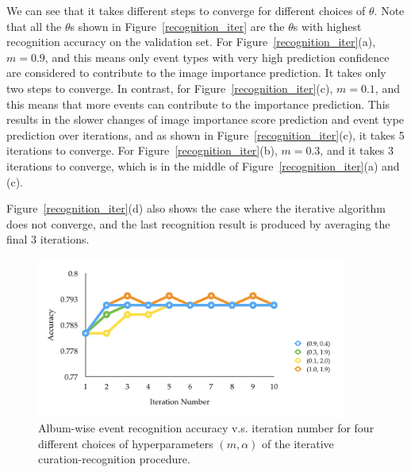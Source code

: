 \documentclass[runningheads]{llncs}
\begin{document}
We can see that it takes different steps to converge for different choices of $\theta$. Note that all the $\theta$s shown in Figure~\ref{recognition_iter} are the $\theta$s with highest recognition accuracy on the validation set.
For Figure~\ref{recognition_iter}(a), $m = 0.9$, and this means only event types with very high prediction confidence are considered to contribute to the image importance prediction. It takes only two steps to converge. In contrast, for Figure~\ref{recognition_iter}(c), $m=0.1$, and this means that more events can contribute to the importance prediction. This results in the slower changes of image importance score prediction and  event type prediction over iterations, and as shown in Figure~\ref{recognition_iter}(c), it takes 5 iterations to converge. For Figure~\ref{recognition_iter}(b), $m=0.3$, and it takes 3 iterations to converge, which is in the middle of Figure~\ref{recognition_iter}(a) and (c).

Figure~\ref{recognition_iter}(d) also shows the case where the iterative algorithm does not converge, and the last recognition result is produced by averaging the final 3 iterations.




\begin{figure}
\vspace{-0.1in}
\centering
\includegraphics[width=4in]{recognition_iterall}
\caption{Album-wise event recognition accuracy v.s. iteration number for four different choices of hyperparameters $ (m, \alpha)$ of the iterative curation-recognition procedure.}
\label{recognition_iterall}
\vspace{-0.2in}
\end{figure}
\end{document}
